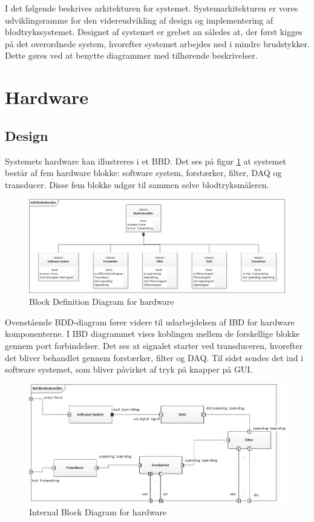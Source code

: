 I det følgende beskrives arkitekturen for systemet. Systemarkitekturen er vores udviklingsramme for den videreudvikling af design og implementering af blodtrykssystemet. Designet af systemet er grebet an således at, der først kigges på det overordnede system, hvorefter systemet arbejdes ned i mindre brudstykker. Dette gøres ved at benytte diagrammer med tilhørende beskrivelser.

\section{Hardware}
\subsection{Design}
Systemets hardware kan illustreres i et BBD. Det ses på figur \ref{fig:BDD} at systemet består af fem hardware blokke: software system, forstærker, filter, DAQ og transducer. Disse fem blokke udgør til sammen selve blodtryksmåleren.  
	
\begin{figure}[H]
	\centering
	\includegraphics[width=1.0\textwidth]{Figurer/BDD}
	\caption{Block Definition Diagram for hardware}
	\label{fig:BDD}
\end{figure}

Ovenstående BDD-diagram fører videre til udarbejdelsen af IBD for hardware komponenterne. I IBD diagrammet vises koblingen mellem de forskellige blokke gennem port forbindelser. Det ses at signalet starter ved transduceren, hvorefter det bliver behandlet gennem forstærker, filter og DAQ. Til sidst sendes det ind i software systemet, som bliver påvirket af tryk på knapper på GUI. 

\begin{figure}[H]
	\centering
	\includegraphics[width=1.0\textwidth]{Figurer/IBD}
	\caption{Internal Block Diagram for hardware}
	\label{fig:IBD}
\end{figure}

